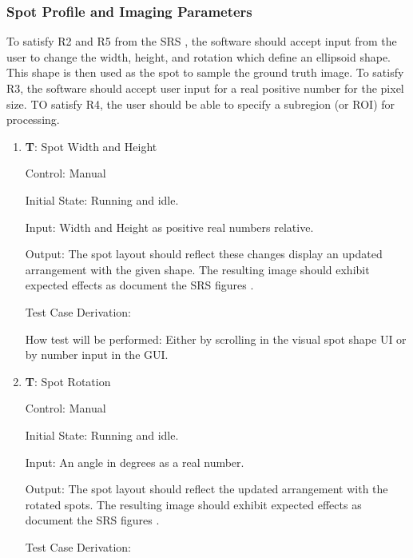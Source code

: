 \documentclass[12pt, titlepage]{article}
\newcounter{testnum} %
\begin{document}
\subsubsection{Spot Profile and Imaging Parameters}

To satisfy R2 and R5 from the SRS \citep{SRS}, the software should accept input from the user
to change the width, height, and rotation which define an ellipsoid shape. 
This shape is then used as the spot to sample the ground truth image.
To satisfy R3, the software should accept user input for a real positive number for the pixel size.
TO satisfy R4, the user should be able to specify a subregion (or ROI) for processing.

\begin{enumerate}

  \item{\textbf{T\thetestnum \label{T_spotSize}}: Spot Width and Height\\}

    Control: Manual
              
    Initial State: Running and idle.
              
    Input: Width and Height as positive real numbers relative.
              
    Output: The spot layout should reflect these changes display an updated arrangement with the given shape.
    The resulting image should exhibit expected effects as document the SRS figures \citep{SRS}.

    Test Case Derivation: 
              
    How test will be performed: Either by scrolling in the visual spot shape UI or by number input in the GUI.
					
  \item{\textbf{T\thetestnum \label{T_spotRotation}}: Spot Rotation\\}

    Control: Manual
                
    Initial State: Running and idle.
              
    Input: An angle in degrees as a real number.
              
    Output: The spot layout should reflect the updated arrangement with the rotated spots.
    The resulting image should exhibit expected effects as document the SRS figures \citep{SRS}.

    Test Case Derivation: 


\end{enumerate}
\end{document}
